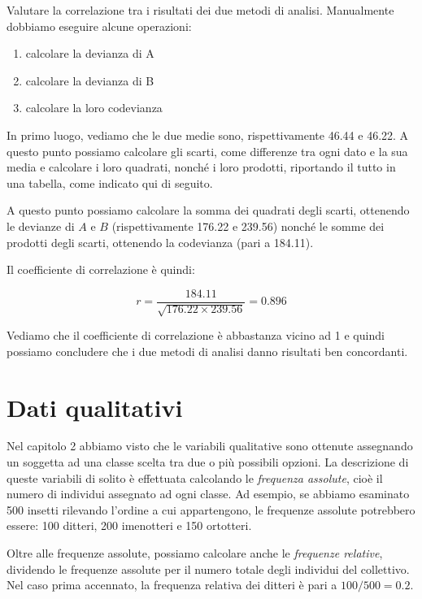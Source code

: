 \documentclass[a4paper,12pt,oneside]{book}
\providecommand{\tightlist}{%
  \setlength{\itemsep}{0pt}\setlength{\parskip}{0pt}}
\begin{document}
Valutare la correlazione tra i risultati dei due metodi di analisi. Manualmente dobbiamo eseguire alcune operazioni:

\begin{enumerate}
\def\labelenumi{\arabic{enumi}.}
\tightlist
\item
  calcolare la devianza di A
\item
  calcolare la devianza di B
\item
  calcolare la loro codevianza
\end{enumerate}

In primo luogo, vediamo che le due medie sono, rispettivamente 46.44 e 46.22. A questo punto possiamo calcolare gli scarti, come differenze tra ogni dato e la sua media e calcolare i loro quadrati, nonché i loro prodotti, riportando il tutto in una tabella, come indicato qui di seguito.

A questo punto possiamo calcolare la somma dei quadrati degli scarti, ottenendo le devianze di \(A\) e \(B\) (rispettivamente 176.22 e 239.56) nonché le somme dei prodotti degli scarti, ottenendo la codevianza (pari a 184.11).

Il coefficiente di correlazione è quindi:

\[r = \frac{184.11}{\sqrt{176.22 \times 239.56}} = 0.896\]

Vediamo che il coefficiente di correlazione è abbastanza vicino ad 1 e quindi possiamo concludere che i due metodi di analisi danno risultati ben concordanti.

\hypertarget{dati-qualitativi}{%
\section{Dati qualitativi}\label{dati-qualitativi}}

Nel capitolo 2 abbiamo visto che le variabili qualitative sono ottenute assegnando un soggetta ad una classe scelta tra due o più possibili opzioni. La descrizione di queste variabili di solito è effettuata calcolando le \emph{frequenza assolute}, cioè il numero di individui assegnato ad ogni classe. Ad esempio, se abbiamo esaminato 500 insetti rilevando l'ordine a cui appartengono, le frequenze assolute potrebbero essere: 100 ditteri, 200 imenotteri e 150 ortotteri.

Oltre alle frequenze assolute, possiamo calcolare anche le \emph{frequenze relative}, dividendo le frequenze assolute per il numero totale degli individui del collettivo. Nel caso prima accennato, la frequenza relativa dei ditteri è pari a \(100/500 = 0.2\).
\end{document}
